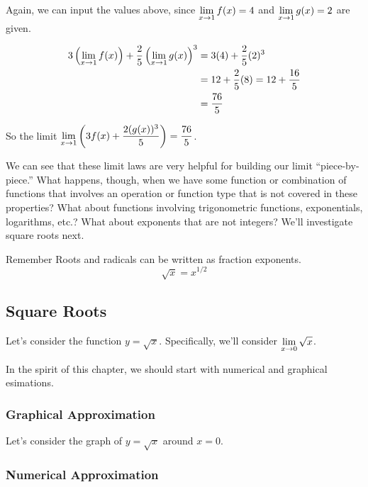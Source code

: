 \begin{enumerate}
  Again, we can input the values above, since $\displaystyle \lim_{x\to1} f(x) = 4$ and $\displaystyle \lim_{x\to 1}g(x) = 2$ are given.

  \begin{align*}
    3\left(\displaystyle \lim_{x\to 1} f(x)\right) + \dfrac{2}{5}\left(\displaystyle \lim_{x\to 1}g(x)\right)^3 & =3(4) + \dfrac{2}{5}(2)^3 \\
    &= 12 + \dfrac{2}{5}(8) = 12 + \dfrac{16}{5}\\
    & = \dfrac{76}{5}
  \end{align*}

  So the limit $\displaystyle \lim_{x\to 1} \left(3f(x)+\dfrac{2(g(x))^3}{5}\right) = \dfrac{76}{5}$.
\end{enumerate}

We can see that these limit laws are very helpful for building our limit ``piece-by-piece.''
What happens, though, when we have some function or combination of functions that involves an operation or function type that is not covered in these properties?
What about functions involving trigonometric functions, exponentials, logarithms, etc.?
What about exponents that are not integers?
We'll investigate square roots next.
\begin{note}{Remember}
  Roots and radicals can be written as fraction exponents.
  \[\sqrt{x} = x^{1/2}\]
\end{note}

\subsection*{Square Roots}

Let's consider the function $y=\sqrt{x}$.
Specifically, we'll consider $\displaystyle \lim_{x\to 0} \sqrt{x}$.

In the spirit of this chapter, we should start with numerical and graphical esimations.

\subsubsection*{Graphical Approximation}

Let's consider the graph of $y=\sqrt{x}$ around $x=0$.




\subsubsection*{Numerical Approximation}

